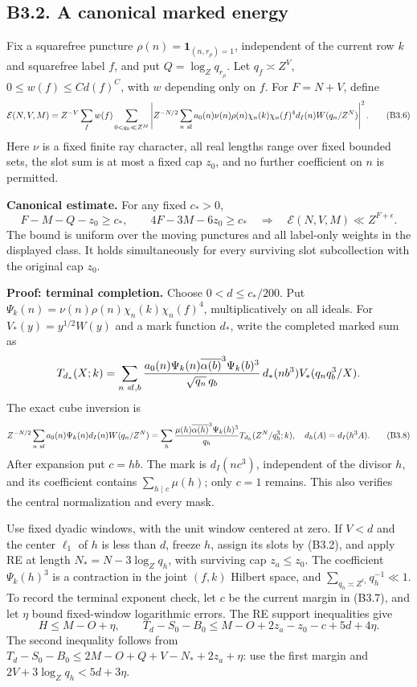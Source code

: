\documentclass[11pt,a4paper]{article}
\begin{document}
\hypertarget{b3.2.-a-canonical-marked-energy}{%
\subsection{B3.2. A canonical marked
energy}\label{b3.2.-a-canonical-marked-energy}}

Fix a squarefree puncture \(\rho(n)=\mathbf1_{(n,\allowbreak{}r_\rho)=1}\),
independent of the current row \(k\) and squarefree label \(f\), and put
\(Q=\log_Zq_{r_\rho}\). Let \(q_f\asymp Z^V\),
\(0\le w(f)\le C d(f)^C\), with \(w\) depending only on \(f\). For
\(F=N+V\), define \[
\mathcal E(N,V,M)=Z^{-V}\sum_f w(f)\sum_{0<q_k\ll Z^M}
 \left|Z^{-N/2}\sum_{n\ {\rm sf}}a_0(n)\nu(n)\rho(n)
       \chi_n(k)\chi_n(f)^4d_I(n)W(q_n/Z^N)\right|^2.
\tag{B3.6}
\] Here \(\nu\) is a fixed finite ray character, all real lengths range
over fixed bounded sets, the slot sum is at most a fixed cap \(z_0\),
and no further coefficient on \(n\) is permitted.

\textbf{Canonical estimate.} For any fixed \(c_*>0\), \[
F-M-Q-z_0\ge c_*,\qquad4F-3M-6z_0\ge c_*
\quad\Longrightarrow\quad
\mathcal E(N,V,M)\ll Z^{F+\epsilon}.
\tag{B3.7}
\] The bound is uniform over the moving punctures and all label-only
weights in the displayed class. It holds simultaneously for every
surviving slot subcollection with the original cap \(z_0\).

\textbf{Proof: terminal completion.} Choose \(0<d\le c_*/200\). Put
\(\Psi_k(n)=\nu(n)\rho(n)\chi_n(k)\chi_n(f)^4\), multiplicatively on all
ideals. For \(V_*(y)=y^{1/2}W(y)\) and a mark function \(d_*\), write
the completed marked sum as \[
T_{d_*}(X;k)=\sum_{n\ {\rm sf},b}
 \frac{a_0(n)\Psi_k(n)\overline{\alpha(b)}^3\Psi_k(b)^3}
      {\sqrt{q_n}\,q_b}\,d_*(nb^3)V_*(q_nq_b^3/X).
\] The exact cube inversion is \[
Z^{-N/2}\sum_{n\ {\rm sf}}a_0(n)\Psi_k(n)d_I(n)W(q_n/Z^N)
=\sum_h\frac{\mu(h)\overline{\alpha(h)}^3\Psi_k(h)^3}{q_h}
 T_{d_h}(Z^N/q_h^3;k),\quad d_h(A)=d_I(h^3A).
\tag{B3.8}
\] After expansion put \(c=hb\). The mark is \(d_I(nc^3)\), independent
of the divisor \(h\), and its coefficient contains
\(\sum_{h\mid c}\mu(h)\); only \(c=1\) remains. This also verifies the
central normalization and every mask.

Use fixed dyadic windows, with the unit window centered at zero. If
\(V<d\) and the center \(\ell_1\) of \(h\) is less than \(d\), freeze
\(h\), assign its slots by (B3.2), and apply RE at length
\(N_*=N-3\log_Zq_h\), with surviving cap \(z_a\le z_0\). The coefficient
\(\Psi_k(h)^3\) is a contraction in the joint \((f,\allowbreak{}k)\) Hilbert space,
and \(\sum_{q_h\asymp Z^{\ell_1}}q_h^{-1}\ll1\). To record the terminal
exponent check, let \(c\) be the current margin in (B3.7), and let
\(\eta\) bound fixed-window logarithmic errors. The RE support
inequalities give \[
H\le M-O+\eta,\qquad
T_d-S_0-B_0\le M-O+2z_a-z_0-c+5d+4\eta.
\tag{B3.9}
\] The second inequality follows from
\(T_d-S_0-B_0\le2M-O+Q+V-N_*+2z_a+\eta\): use the first margin and
\(2V+3\log_Zq_h<5d+3\eta\).
\end{document}
